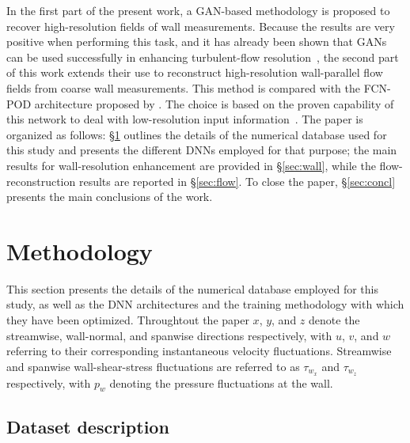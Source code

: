 In the first part of the present work, a GAN-based methodology is proposed to recover high-resolution fields of wall measurements.
Because the results are very positive when performing this task, and it has already been shown that GANs can be used successfully in enhancing turbulent-flow resolution~\citep{kim2021unsupervised}, the second part of this work extends their use to reconstruct high-resolution wall-parallel flow fields from coarse wall measurements.
This method is compared with the FCN-POD architecture proposed by \citet{guastoni2020convolutional}.
The choice is based on the proven capability of this network to deal with low-resolution input information~\citep{guemes2019sensing}.
The paper is organized as follows: \S\ref{sec:metho} outlines the details of the numerical database used for this study and presents the different DNNs employed for that purpose; the main results for wall-resolution enhancement are provided in \S\ref{sec:wall}, while the flow-reconstruction results are reported in \S\ref{sec:flow}.
To close the paper, \S\ref{sec:concl} presents the main conclusions of the work.

\section{Methodology}\label{sec:metho}

This section presents the details of the numerical database employed for this study, as well as the DNN architectures and the training methodology with which they have been optimized.
Throughtout the paper $x$, $y$, and $z$ denote the streamwise, wall-normal, and spanwise directions respectively, with $u$, $v$, and $w$ referring to their corresponding instantaneous velocity fluctuations.
Streamwise and spanwise wall-shear-stress fluctuations are referred to as $\tau_{w_x}$ and $\tau_{w_z}$ respectively, with $p_w$ denoting the pressure fluctuations at the wall.

\subsection{Dataset description}


